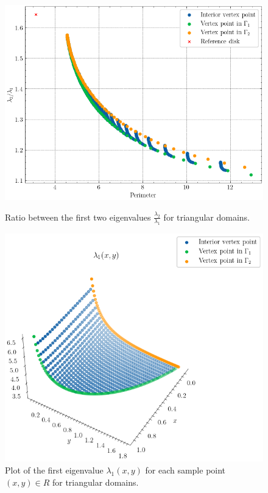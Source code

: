 \begin{figure}[!htb]
    \begin{minipage}[c]{0.41\textwidth}
        \centering
        \includegraphics[width=\textwidth]{Images/Dirac/triangles/triangle_benguria.png}
        \captionsetup{width=0.9\linewidth} %
        \caption{Ratio between the first two eigenvalues \(\frac{\lambda_2}{\lambda_1}\) for triangular domains.}
        \label{dirac_triangle_benguria}
    \end{minipage}
    \hfill
    \begin{minipage}[c]{0.49\textwidth}
        \centering
        \includegraphics[width=\textwidth]{Images/Dirac/triangles/triangle_3d_lambda1.png}
        \captionsetup{width=0.9\linewidth} %
        \caption{Plot of the first eigenvalue \(\lambda_1(x,y)\) for each sample point \((x,y) \in R\) for triangular domains.}
        \label{dirac_triangle_3d_lambda1}
    \end{minipage}
    \vspace{0.5cm}
\end{figure}

